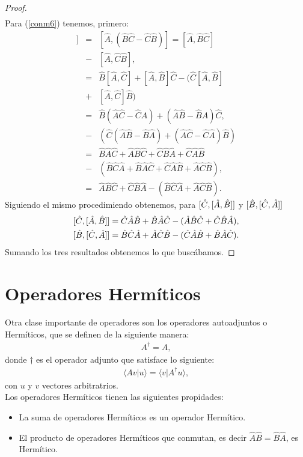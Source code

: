 \documentclass[letterpaper,12pt,oneside]{book}
\begin{document}
\begin{proof}
\begin{eqnarray}
\end{eqnarray}
%
Para (\ref{conm6}) tenemos, primero:
%
\begin{eqnarray}
[\hat A, [\hat B, \hat C]] &=& [\hat A,(\hat B \hat C - \hat C \hat B )] = [\hat A,\hat B \hat C]\\
&-&[\hat A, \hat C \hat B]\nonumber,\\
&=&\hat B [\hat A , \hat C] + [\hat A , \hat B]\hat C - (\hat C [\hat A, \hat B]\nonumber \\ 
&+&[\hat A , \hat C ]\hat B)\\
&=& \hat B (\hat A \hat C - \hat C \hat A) + (\hat A \hat B - \hat B \hat A) \hat C,\nonumber\\
 &-& (\hat C (\hat A \hat B - \hat B \hat A) + (\hat A \hat C - \hat C \hat A)\hat B )\\
&=& \hat B \hat A \hat C + \hat A \hat B \hat C + \hat C \hat B \hat A + \hat C \hat A \hat B\nonumber\\
&-& (\hat B \hat C \hat A + \hat B \hat A \hat C+ \hat C \hat A \hat B + \hat A \hat C \hat B),\\
&=& \hat A \hat B \hat C + \hat C \hat B \hat A - (\hat B \hat C \hat A + \hat A \hat C \hat B).
\end{eqnarray}
%
Siguiendo el mismo procedimiendo obtenemos, para $\protect [\hat C, [\hat A, \hat B]]$ y $\protect [\hat B, [\hat C, \hat A]]$
%
\begin{eqnarray}
\protect [\hat C, [\hat A, \hat B]] =  \hat C \hat A \hat B + \hat B \hat A \hat C -(\hat A \hat B \hat C + \hat C \hat B \hat A ),\\
\protect [\hat B, [\hat C, \hat A]] =  \hat B \hat C \hat A + \hat A \hat C \hat B -(\hat C \hat A \hat B + \hat B \hat A \hat C ).
\end{eqnarray}
Sumando los tres resultados obtenemos lo que busc\'abamos.
\end{proof}

\section{Operadores Herm\'iticos } 
Otra clase importante de operadores son los operadores autoadjuntos o Herm\'iticos, que se definen de la siguiente manera:
%
\begin{eqnarray}
A^\dagger = A,
\end{eqnarray}
%
donde $\dagger$ es el operador adjunto que satisface lo siguiente:
%
\begin{eqnarray}
\langle Av | u\rangle = \langle v | A^\dagger u\rangle,
\end{eqnarray}
con $u$ y $v$ vectores arbitratrios.\\
Los operadores Herm\'iticos tienen las siguientes propidades:
%
\begin{itemize}
\item La suma de operadores Herm\'iticos es un operador Herm\'itico.
\item El producto de operadores Herm\'iticos que conmutan, es decir $\hat A \hat B = \hat B \hat A$, es Herm\'itico.
\end{itemize}
%
\end{document}
